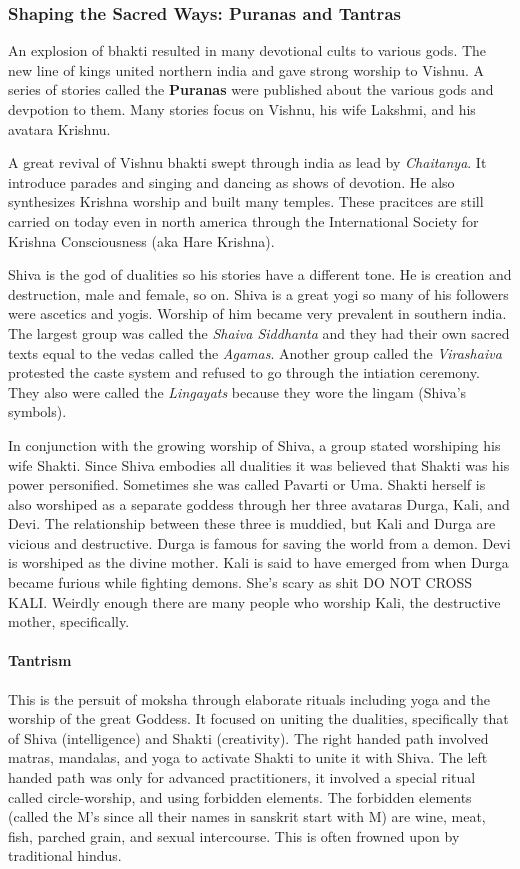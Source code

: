 \documentclass{article}
\begin{document}
\subsubsection{Shaping the Sacred Ways: Puranas and Tantras}
\label{ssub:shaping_the_sacred_ways_puranas_and_tantras}
An explosion of bhakti resulted in many devotional cults to various gods. The new line of kings united northern india and gave strong worship to Vishnu. A series of stories called the \textbf{Puranas} were published about the various gods and devpotion to them. Many stories focus on Vishnu, his wife Lakshmi, and his avatara Krishnu.

A great revival of Vishnu bhakti swept through india as lead by \emph{Chaitanya}. It introduce parades and singing and dancing as shows of devotion. He also synthesizes Krishna worship and built many temples. These pracitces are still carried on today even in north america through the International Society for Krishna Consciousness (aka Hare Krishna).

Shiva is the god of dualities so his stories have a different tone. He is creation and destruction, male and female, so on. Shiva is a great yogi so many of his followers were ascetics and yogis. Worship of him became very prevalent in southern india. The largest group was called the \emph{Shaiva Siddhanta} and they had their own sacred texts equal to the vedas called the \emph{Agamas}. Another group called the \emph{Virashaiva} protested the caste system and refused to go through the intiation ceremony. They also were called the \emph{Lingayats} because they wore the lingam (Shiva's symbols).

In conjunction with the growing worship of Shiva, a group stated worshiping his wife Shakti. Since Shiva embodies all dualities it was believed that Shakti was his power personified. Sometimes she was called Pavarti or Uma. Shakti herself is also worshiped as a separate goddess through her three avataras Durga, Kali, and Devi. The relationship between these three is muddied, but Kali and Durga are vicious and destructive. Durga is famous for saving the world from a demon. Devi is worshiped as the divine mother. Kali is said to have emerged from when Durga became furious while fighting demons. She's scary as shit DO NOT CROSS KALI. Weirdly enough there are many people who worship Kali, the destructive mother, specifically.

\paragraph{Tantrism}
\label{par:tantrism}
This is the persuit of moksha through elaborate rituals including yoga and the worship of the great Goddess. It focused on uniting the dualities, specifically that of Shiva (intelligence) and Shakti (creativity). The right handed path involved matras, mandalas, and yoga to activate Shakti to unite it with Shiva. The left handed path was only for advanced practitioners, it involved a special ritual called circle-worship, and using forbidden elements. The forbidden elements (called the  M's since all their names in sanskrit start with M) are wine, meat, fish, parched grain, and sexual intercourse. This is often frowned upon by traditional hindus.
\end{document}
